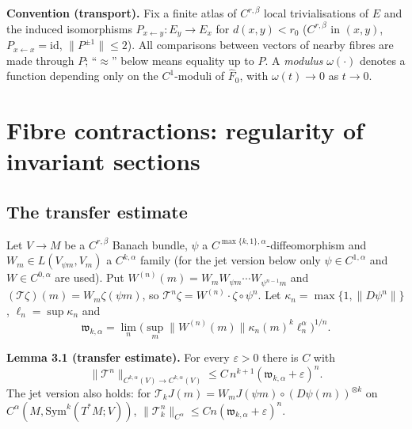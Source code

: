 \documentclass[11pt,a4paper]{article}
\theoremstyle{plain}
\theoremstyle{definition}
\theoremstyle{remark}
\numberwithin{equation}{section}
\numberwithin{figure}{section}
\begin{document}
\textbf{Convention (transport).} Fix a finite atlas of $C^{r,\beta}$ local trivialisations of $E$ and the induced isomorphisms $P_{x\leftarrow y}:E_y\to E_x$ for $d(x,y)<r_0$ ($C^{r,\beta}$ in $(x,y)$, $P_{x\leftarrow x}=\mathrm{id}$, $\|P^{\pm1}\|\le2$). All comparisons between vectors of nearby fibres are made through $P$; ``$\approx$'' below means equality up to $P$. A \textit{modulus} $\omega(\cdot)$ denotes a function depending only on the $C^{1}$-moduli of $\widehat F_0$, with $\omega(t)\to0$ as $t\to0$.

\section{Fibre contractions: regularity of invariant sections}

\subsection{The transfer estimate}

Let $V\to M$ be a $C^{r,\beta}$ Banach bundle, $\psi$ a $C^{\max\{k,1\},\alpha}$-diffeomorphism and $W_m\in L(V_{\psi m},V_m)$ a $C^{k,\alpha}$ family (for the jet version below only $\psi\in C^{1,\alpha}$ and $W\in C^{0,\alpha}$ are used). Put $W^{(n)}(m)=W_mW_{\psi m}\cdots W_{\psi^{n-1}m}$ and $(\mathcal T\zeta)(m)=W_m\zeta(\psi m)$, so $\mathcal T^n\zeta=W^{(n)}\cdot\zeta\circ\psi^n$. Let $\kappa_n=\max\{1,\|D\psi^n\|\}$, $\ell_n=\sup\kappa_n$ and
\[
\mathfrak w_{k,\alpha}=\lim_n\big(\sup_m\|W^{(n)}(m)\|\kappa_n(m)^k\ell_n^\alpha\big)^{1/n}.
\]

\textbf{Lemma 3.1 (transfer estimate).} For every $\varepsilon>0$ there is $C$ with
\[
\|\mathcal T^n\|_{C^{k,\alpha}(V)\to C^{k,\alpha}(V)}\le C\,n^{k+1}(\mathfrak w_{k,\alpha}+\varepsilon)^n .
\]
The jet version also holds: for $\mathcal T_kJ(m)=W_mJ(\psi m)\circ(D\psi(m))^{\otimes k}$ on $C^{\alpha}(M,\mathrm{Sym}^k(T^*M;V))$, $\|\mathcal T_k^n\|_{C^\alpha}\le Cn(\mathfrak w_{k,\alpha}+\varepsilon)^n$.
\end{document}
